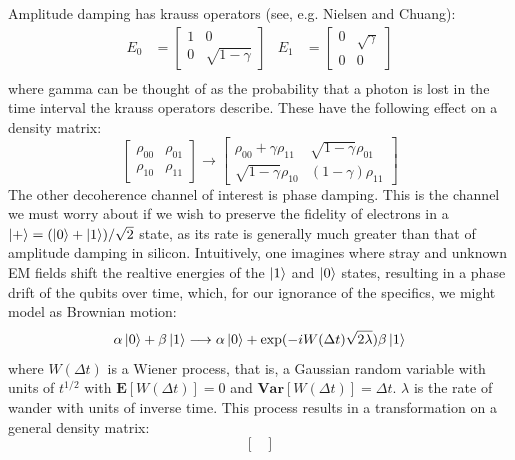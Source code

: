 \documentclass{report}
\begin{document}
\begin{appendices}
Amplitude damping has krauss operators (see, e.g. Nielsen and Chuang):
\begin{align*}
E_0 &= \begin{bmatrix}
1 & 0\\
0 & \sqrt{1-\gamma} 
\end{bmatrix}   &   E_1 &= \begin{bmatrix}
0 & \sqrt{\gamma}\\
0 & 0 
\end{bmatrix}\\
\end{align*}
where gamma can be thought of as the probability that a photon is lost in the time interval the krauss operators describe. These have the following effect on a density matrix:
\begin{equation*}
    \begin{bmatrix}
        \rho_{00} & \rho_{01} \\ \rho_{10} & \rho_{11}
    \end{bmatrix}
    \longrightarrow
    \begin{bmatrix}
        \rho_{00} + \gamma \rho_{11} & \sqrt{1-\gamma} \rho_{01} \\ \sqrt{1-\gamma} \rho_{10} & (1-\gamma) \rho_{11}
    \end{bmatrix}
\end{equation*}
The other decoherence channel of interest is phase damping. This is the channel we must worry about if we wish to preserve the fidelity of electrons in a $\ket{+} = (\ket{0} + \ket{1})/\sqrt{2}$ state, as its rate is generally much greater than that of amplitude damping in silicon. Intuitively, one imagines where stray and unknown EM fields shift the realtive energies of the $\ket{1}$ and $\ket{0}$ states, resulting in a phase drift of the qubits over time, which, for our ignorance of the specifics, we might model as Brownian motion:
\begin{equation*}
\alpha\ket{0} + \beta\ket{1} \longrightarrow \alpha\ket{0} + \exp(-i W(\Delta t) \sqrt{2\lambda}) \beta\ket{1}
\end{equation*}
where $W(\Delta t)$ is a Wiener process, that is, a Gaussian random variable with units of $t^{1/2}$ with $\mathbf{E}[W(\Delta t)] = 0$ and $\mathbf{Var}[W(\Delta t)] = \Delta t$. $\lambda$ is the rate of wander with units of inverse time. This process results in a transformation on a general density matrix:
\begin{equation} \label{eq:phasedamptrans}
    \begin{bmatrix}

\end{bmatrix}
\end{equation}
\end{appendices}
\end{document}
